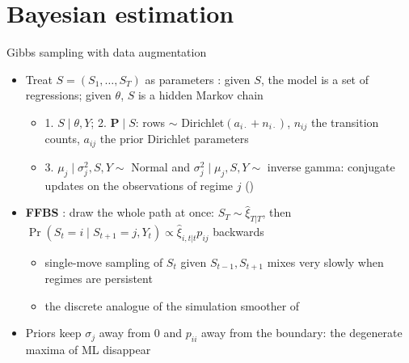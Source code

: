 \section{Bayesian estimation}

\begin{frame}{Gibbs sampling with data augmentation}
\itemsize{\small}
\begin{itemize}
    \item \hypertarget{ch7bayes}{}Treat $S = (S_1, \dots, S_T)$ as parameters : given $S$, the model is a set of regressions; given $\theta$, $S$ is a hidden Markov chain
    \begin{itemize}
        \item 1. $S \mid \theta, Y$; 2. $\mathbf{P} \mid S$: rows $\sim$ Dirichlet$(a_{i\cdot} + n_{i\cdot})$, $n_{ij}$ the transition counts, $a_{ij}$ the prior Dirichlet parameters
        \item 3. $\mu_j \mid \sigma_j^2, S, Y \sim$ Normal and $\sigma_j^2 \mid \mu_j, S, Y \sim$ inverse gamma: conjugate updates on the observations of regime $j$ ()
    \end{itemize}
    \item \textbf{FFBS} : draw the whole path at once: $S_T \sim \hat\xi_{T|T}$, then $\Pr(S_t = i \mid S_{t+1} = j, Y_t) \propto \hat\xi_{i,t|t}p_{ij}$ backwards
    \begin{itemize}
        \item single-move sampling of $S_t$ given $S_{t-1}, S_{t+1}$ mixes very slowly when regimes are persistent
        \item the discrete analogue of the simulation smoother of  
    \end{itemize}
    \item Priors keep $\sigma_j$ away from 0 and $p_{ii}$ away from the boundary: the degenerate maxima of ML disappear
\end{itemize}
\end{frame}

